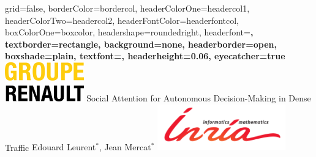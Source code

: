 \documentclass[paperwidth=36in,paperheight=48in,portrait,fontscale=0.3, margin=2cm]{baposter}
\begin{document}
\begin{poster}{
grid=false,
borderColor=bordercol, %
headerColorOne=headercol1, %
headerColorTwo=headercol2, %
headerFontColor=headerfontcol, %
boxColorOne=boxcolor, %
headershape=roundedright, %
headerfont=\Large\bf\textsc, %
textborder=rectangle,
background=none,
headerborder=open, %
boxshade=plain,
textfont={\setlength{\parindent}{0.0em}\sffamily},
headerheight={0.06\textheight},
eyecatcher=true
}
%
%
{
\includegraphics[height=1.7cm]{./img/companies}
}
{
Social Attention for Autonomous Decision-Making in Dense Traffic
}
{
Edouard Leurent$^*$, Jean Mercat$^*$
}
{
\includegraphics[height=2cm]{./img/inria_sc}
}


\end{poster}
\end{document}
